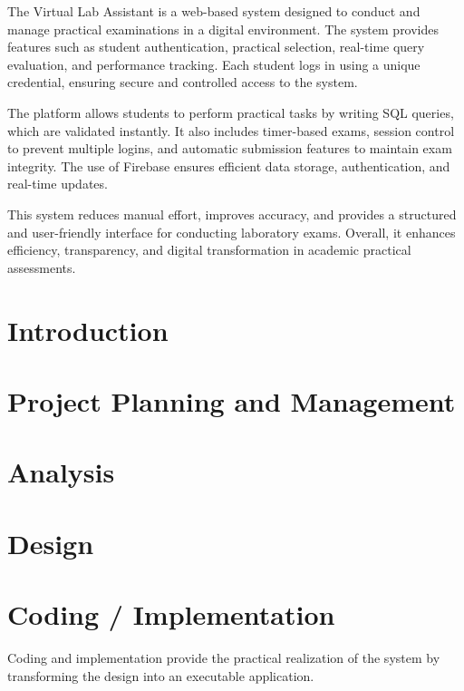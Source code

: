 \documentclass{SSBT-BE}
\begin{document}

The Virtual Lab Assistant is a web-based system designed to conduct and manage practical examinations in a digital environment. 
The system provides features such as student authentication, practical selection, real-time query evaluation, and performance tracking. 
Each student logs in using a unique credential, ensuring secure and controlled access to the system. 

The platform allows students to perform practical tasks by writing SQL queries, which are validated instantly. 
It also includes timer-based exams, session control to prevent multiple logins, and automatic submission features to maintain exam integrity. 
The use of Firebase ensures efficient data storage, authentication, and real-time updates. 

This system reduces manual effort, improves accuracy, and provides a structured and user-friendly interface for conducting laboratory exams. 
Overall, it enhances efficiency, transparency, and digital transformation in academic practical assessments.



            
\chapter{Introduction}



\chapter{Project Planning and Management}


\chapter{Analysis}


\chapter{Design}


\chapter{Coding / Implementation}

Coding and implementation provide the practical realization of the system by transforming the design into an executable application.
\end{document}

